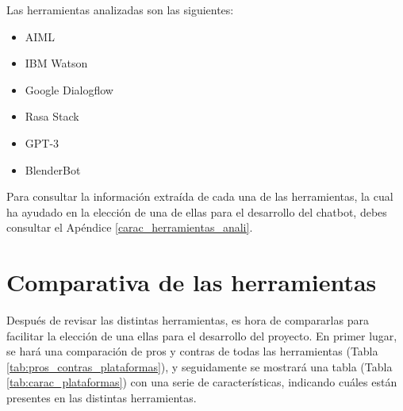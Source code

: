 Las herramientas analizadas son las siguientes:

\begin{itemize}
    \item AIML
    \item IBM Watson
    \item Google Dialogflow
    \item Rasa Stack
    \item GPT-3
    \item BlenderBot
\end{itemize}

Para consultar la información extraída de cada una de las herramientas, la cual ha ayudado en la elección de una de ellas para el desarrollo del chatbot, debes consultar el Apéndice \ref{carac_herramientas_anali}.


\section{Comparativa de las herramientas}

Después de revisar las distintas herramientas, es hora de compararlas para facilitar la elección de una ellas para el desarrollo del proyecto. En primer lugar, se hará una comparación de pros y contras de todas las herramientas (Tabla \ref{tab:pros_contras_plataformas}), y seguidamente se mostrará una tabla (Tabla \ref{tab:carac_plataformas}) con una serie de características, indicando cuáles están presentes en las distintas herramientas.


